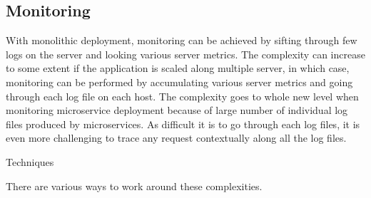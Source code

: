 \subsection{Monitoring}\label{section:challanges_of_microservices_architecture/monitoring}
With monolithic deployment, monitoring can be achieved by sifting through few logs on the server and looking various server metrics. The complexity can increase to some extent if the application is scaled along multiple server, in which case, monitoring can be performed by accumulating various server metrics and going through each log file on each host.
The complexity goes to whole new level when monitoring microservice deployment because of large number of individual log files produced by microservices. As difficult it is to go through each log files, it is even more challenging to trace any request contextually along all the log files.
\\
\begin{shaded}Techniques\end{shaded}
There are various ways to work around these complexities. \cite{Newman:2015aa} \cite{Simone:2014aa}

